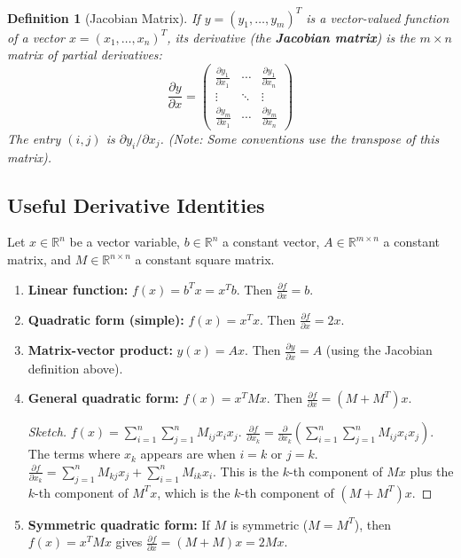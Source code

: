 \documentclass[11pt, a4paper]{article}
\theoremstyle{mydefinitionstyle}
\newtheorem{definition}{Definition}[section]
\theoremstyle{mytheoremstyle}
\newcommand{\R}{\mathbb{R}}
\begin{document}
\begin{definition}[Jacobian Matrix] \label{def:jacobian}
    If $y = (y_1, \dots, y_m)^T$ is a vector-valued function of a vector $x = (x_1, \dots, x_n)^T$, its derivative (the \textbf{Jacobian matrix}) is the $m \times n$ matrix of partial derivatives:
    \[ \frac{\partial y}{\partial x} = \begin{pmatrix}
        \frac{\partial y_1}{\partial x_1} & \cdots & \frac{\partial y_1}{\partial x_n} \\
        \vdots & \ddots & \vdots \\
        \frac{\partial y_m}{\partial x_1} & \cdots & \frac{\partial y_m}{\partial x_n}
       \end{pmatrix} \]
    The entry $(i,j)$ is $\partial y_i / \partial x_j$. (Note: Some conventions use the transpose of this matrix).
\end{definition}

\subsection{Useful Derivative Identities}

Let $x \in \R^n$ be a vector variable, $b \in \R^n$ a constant vector, $A \in \R^{m \times n}$ a constant matrix, and $M \in \R^{n \times n}$ a constant square matrix.

\begin{enumerate}
    \item \textbf{Linear function:} $f(x) = b^T x = x^T b$. Then $\frac{\partial f}{\partial x} = b$.
    \item \textbf{Quadratic form (simple):} $f(x) = x^T x$. Then $\frac{\partial f}{\partial x} = 2x$.
    \item \textbf{Matrix-vector product:} $y(x) = Ax$. Then $\frac{\partial y}{\partial x} = A$ (using the Jacobian definition above).
    \item \textbf{General quadratic form:} $f(x) = x^T M x$. Then $\frac{\partial f}{\partial x} = (M + M^T)x$.
        \begin{proof}[Sketch]
            $f(x) = \sum_{i=1}^n \sum_{j=1}^n M_{ij} x_i x_j$.
            $\frac{\partial f}{\partial x_k} = \frac{\partial}{\partial x_k} (\sum_{i=1}^n \sum_{j=1}^n M_{ij} x_i x_j)$. The terms where $x_k$ appears are when $i=k$ or $j=k$.
            $\frac{\partial f}{\partial x_k} = \sum_{j=1}^n M_{kj} x_j + \sum_{i=1}^n M_{ik} x_i$.
            This is the $k$-th component of $Mx$ plus the $k$-th component of $M^T x$, which is the $k$-th component of $(M + M^T)x$.
        \end{proof}
    \item \textbf{Symmetric quadratic form:} If $M$ is symmetric ($M=M^T$), then $f(x) = x^T M x$ gives $\frac{\partial f}{\partial x} = (M + M)x = 2Mx$.
\end{enumerate}
\end{document}

